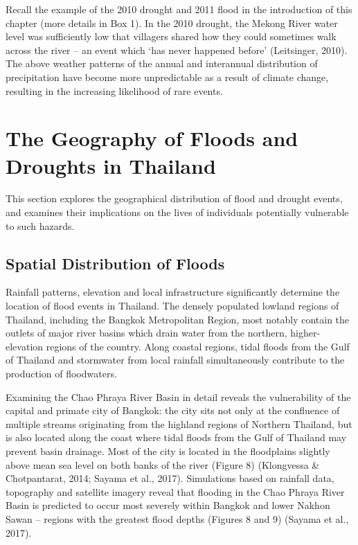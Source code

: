 Recall the example of the 2010 drought and 2011 flood in the introduction of this chapter (more details in Box 1). In the 2010 drought, the Mekong River water level was sufficiently low that villagers shared how they could sometimes walk across the river -- an event which ‘has never happened before’ (Leitsinger, 2010). The above weather patterns of the annual and interannual distribution of precipitation have become more unpredictable as a result of climate change, resulting in the increasing likelihood of rare events.


\section{The Geography of Floods and Droughts in Thailand}

This section explores the geographical distribution of flood and drought events, and examines their implications on the lives of individuals potentially vulnerable to such hazards.

\subsection{Spatial Distribution of Floods}

Rainfall patterns, elevation and local infrastructure significantly determine the location of flood events in Thailand. The densely populated lowland regions of Thailand, including the Bangkok Metropolitan Region, most notably contain the outlets of major river basins which drain water from the northern, higher-elevation regions of the country. Along coastal regions, tidal floods from the Gulf of Thailand and stormwater from local rainfall simultaneously contribute to the production of floodwaters.

Examining the Chao Phraya River Basin in detail reveals the vulnerability of the capital and primate city of Bangkok: the city sits not only at the confluence of multiple streams originating from the highland regions of Northern Thailand, but is also located along the coast where tidal floods from the Gulf of Thailand may prevent basin drainage. Most of the city is located in the floodplains slightly above mean sea level on both banks of the river (Figure 8) (Klongvessa & Chotpantarat, 2014; Sayama et al., 2017). Simulations based on rainfall data, topography and satellite imagery reveal that flooding in the Chao Phraya River Basin is predicted to occur most severely within Bangkok and lower Nakhon Sawan -- regions with the greatest flood depths (Figures 8 and 9) (Sayama et al., 2017).


